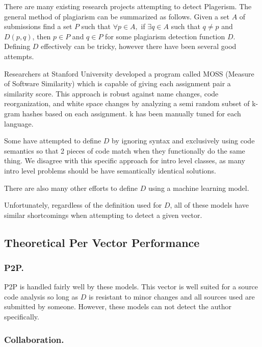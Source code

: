 \documentclass[10pt]{article}
\begin{document}
There are many existing research projects attempting to detect Plagerism.  The general method of plagiarism can be summarized as follows.  Given a set $A$ of submissions find a set $P$ such that  $\forall p\in A,$ if $\exists q\in A$ such that $q\not=p$ and $D(p,q)$, then $p\in P$ and $q\in P$ for some plagiarism detection function $D$.  Defining $D$ effectively can be tricky\cite{attitude}, however there have been several good attempts.
	
		Researchers at Stanford University developed a program called MOSS (Measure of Software Similarity) which is capable of giving each assignment pair a similarity score. This approach is robust against name changes, code reorganization, and white space changes by analyzing a semi random subset of k-gram hashes based on each assignment.  k has been manually tuned for each language\cite{moss}.
	
	Some have attempted to define $D$ by ignoring syntax and exclusively using code semantics\cite{semantic} so that 2 pieces of code match when they functionally do the same thing.  We disagree with this specific approach for intro level classes, as many intro level problems should be have semantically identical solutions. 
	
	There are also many other efforts to define $D$ using a machine learning model\cite{uu_thesis}\cite{IIITH_thesis}\cite{mp_ml}\cite{ml_style}.
	
	Unfortunately, regardless of the definition used for $D$, all of these models have similar shortcomings when attempting to detect a given vector.
\subsection{Theoretical Per Vector Performance}

	\subsubsection{P2P.\hspace{0.5em}\phantom{}}
	
		P2P is handled fairly well by these models.  This vector is well suited for a source code analysis so long as $D$ is resistant to minor changes and all sources used are submitted by someone.  However, these models can not detect the author specifically.
	\subsubsection{Collaboration.\hspace{0.5em}\phantom{}}
	
\end{document}

